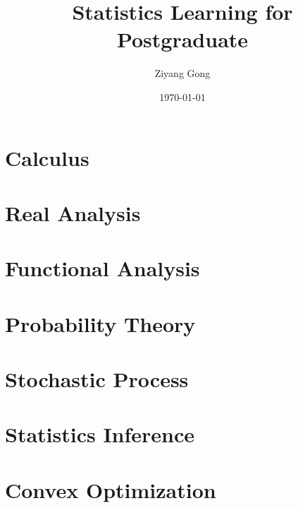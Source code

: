\documentclass[pad,12pt,mtpro2]{elegantbook}
\title{Statistics Learning for Postgraduate}
\author{Ziyang Gong}
\date{\today}
\begin{document}
\maketitle
\tableofcontents
\mainmatter
\hypersetup{pageanchor=true}

\part{Calculus}




\part{Real Analysis}



\part{Functional Analysis}

\part{Probability Theory}






\part{Stochastic Process}


\part{Statistics Inference}






\part{Convex Optimization}


\end{document}
